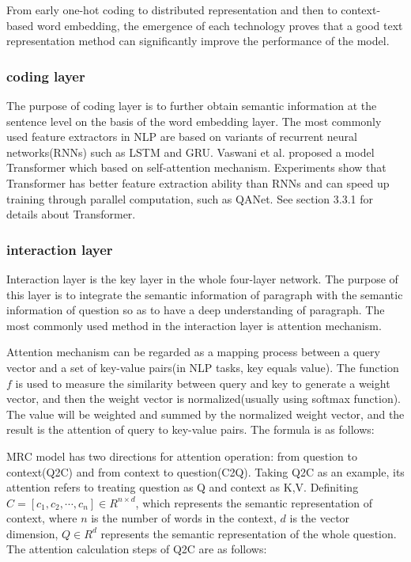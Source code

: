 \documentclass{article}
\newcommand{\upcite}[1]{\textsuperscript{\textsuperscript{\cite{#1}}}}
\begin{document}
From early one-hot coding to distributed representation and then to context-based word embedding, the emergence of each technology proves that 
a good text representation method can significantly improve the performance of the model.


\subsubsection{coding layer}
The purpose of coding layer is to further obtain semantic information at the sentence level on the basis of the word embedding layer. 
The most commonly used feature extractors in NLP are based on variants of recurrent neural networks(RNNs) such as LSTM and GRU. Vaswani et al. proposed 
a model Transformer which based on self-attention mechanism. Experiments show that Transformer has better feature extraction ability than RNNs and can 
speed up training through parallel computation, such as QANet\upcite{QANet}. See section 3.3.1 for details about Transformer.

\subsubsection{interaction layer}
Interaction layer is the key layer in the whole four-layer network. The purpose of this layer is to integrate the semantic information of paragraph with the semantic 
information of question so as to have a deep understanding of paragraph. The most commonly used method in the interaction layer is attention mechanism.

Attention mechanism can be regarded as a mapping process between a query vector and a set of key-value pairs(in NLP tasks, key equals value). The function $f$ is 
used to measure the similarity between query and key to generate a weight vector, and then the weight vector is normalized(usually using softmax function). The value will be 
weighted and summed by the normalized weight vector, and the result is the attention of query to key-value pairs. The formula is as follows: 

MRC model has two directions for attention operation: from question to context(Q2C) and from context to question(C2Q). Taking Q2C as an example, 
its attention refers to treating question as Q and context as K,V. Definiting $C=[c_1,c_2,\cdots,c_n]\in R^{n\times d}$, 
which represents the semantic representation of context, where $n$ is the number of 
words in the context, $d$ is the vector dimension, $Q\in R^d$ represents the semantic representation of the whole question. 
The attention calculation steps of Q2C are as follows:
\end{document}
